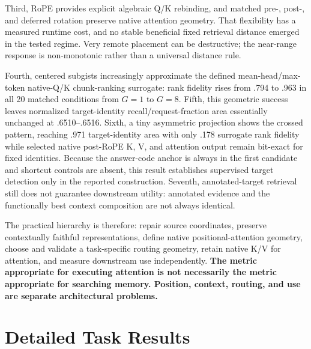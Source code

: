 \documentclass[11pt]{article}
\begin{document}
Third, RoPE provides explicit algebraic Q/K rebinding, and matched pre-, post-, and deferred
rotation preserve native attention geometry. That flexibility has a measured runtime cost, and
no stable beneficial fixed retrieval distance emerged in the tested regime. Very remote
placement can be destructive; the near-range response is non-monotonic rather than a universal
distance rule.

Fourth, centered subgists increasingly approximate the defined mean-head/max-token native-Q/K
chunk-ranking surrogate: rank fidelity rises from .794 to .963 in all 20 matched conditions
from $G=1$ to $G=8$. Fifth, this geometric success leaves normalized target-identity
recall/request-fraction area essentially unchanged at .6510--.6516. Sixth, a tiny asymmetric
projection shows the crossed pattern, reaching .971 target-identity area with only .178
surrogate rank fidelity while selected native post-RoPE K, V, and attention output remain
bit-exact for fixed identities. Because the answer-code anchor is always in the first candidate
and shortcut controls are absent, this result establishes supervised target detection only in
the reported construction. Seventh, annotated-target retrieval still does not guarantee
downstream utility: annotated evidence and the functionally best context composition are not
always identical.

The practical hierarchy is therefore: repair source coordinates, preserve contextually
faithful representations, define native positional-attention geometry, choose and validate a
task-specific routing geometry, retain native K/V for attention, and measure downstream use independently.
\textbf{The metric appropriate for executing attention is not necessarily the metric
appropriate for searching memory. Position, context, routing, and use are separate
architectural problems.}

\appendix

\section{Detailed Task Results}
\end{document}
